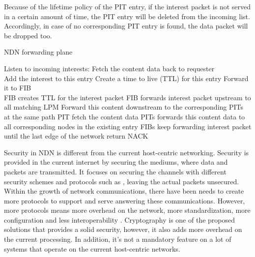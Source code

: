 \documentclass[conference]{IEEEtran}
\begin{document}
Because of the lifetime policy of the PIT entry, if the interest packet is not served in a certain amount of time, the PIT entry will be deleted from the incoming list. Accordingly, in case of no corresponding PIT entry is found, the data packet will be dropped too.


\begin{algorithm}
\caption{NDN forwarding plane}
\begin{algorithmic}[1]
\State Listen to incoming interests:
\State Fetch the content data back to requester 
\EndIf\\
\State Add the interest to this entry
\State  Create a time to live (TTL) for this entry
\State  Forward it to FIB
\EndIf\\
\State FIB creates TTL for the interest packet
\State FIB forwards interest packet upstream to all 
\State matching LPM
\State Forward this content downstream to the 
\State corresponding PITs at the same path
\State PIT fetch the content data
\State PITs forwards this content data to all 
\State corresponding nodes in the existing entry
\State FIBs keep forwarding interest packet until 
\State the last edge of the network
\State return NACK
\EndIf
\EndWhile
\EndWhile
\end{algorithmic}
\end{algorithm}
  
Security in NDN is different from the current host-centric networking. Security is provided in the current internet by securing the mediums, where data and packets are transmitted. It focuses on securing the channels with different security schemes and protocols such as \cite{NGUYEN201517}\cite{661700}\cite{Fumy1998}\cite{Prentice-Hall:2000:ISP:518066}, leaving the actual packets unsecured. Within the growth of network communications, there have been needs to create more protocols to support and serve answering these communications. However, more protocols means more overhead on the network, more standardization, more configuration and less interoperability \cite{cholez:hal-00785298}. Cryptography is one of the proposed solutions that provides a solid security, however, it also adds more overhead on the current processing. In addition, it's not a mandatory feature on a lot of systems that operate on the current host-centric networks.
\end{document}
